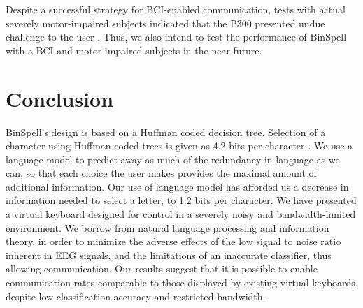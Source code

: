 \documentclass[12pt,titlepage]{article}
\begin{document}
Despite a successful strategy for BCI-enabled communication, tests with actual severely motor-impaired subjects indicated that the P300 presented undue challenge to the user \cite{sellers_p300-based_2006}.  Thus, we also intend to test the performance of BinSpell with a BCI and motor impaired subjects in the near future.

\section{Conclusion}
BinSpell's design is based on a Huffman coded decision tree.  Selection of a character using Huffman-coded trees is given as 4.2 bits per character \cite{mackay_information_2002}.  We use a language model to predict away as much of the redundancy in language as we can, so that each choice the user makes provides the maximal amount of additional information.  Our use of language model has afforded us a decrease in information needed to select a letter, to 1.2 bits per character.    
We have presented a virtual keyboard designed for control in a severely noisy and
bandwidth-limited environment.  We borrow from natural language processing and information theory, in 
order to minimize the adverse effects of the low signal to noise ratio inherent in EEG signals, 
and the limitations of an inaccurate classifier, thus allowing communication.  Our results suggest that it is possible to enable communication rates comparable to those displayed by existing virtual keyboards, despite low classification accuracy and restricted bandwidth.



\end{document}
